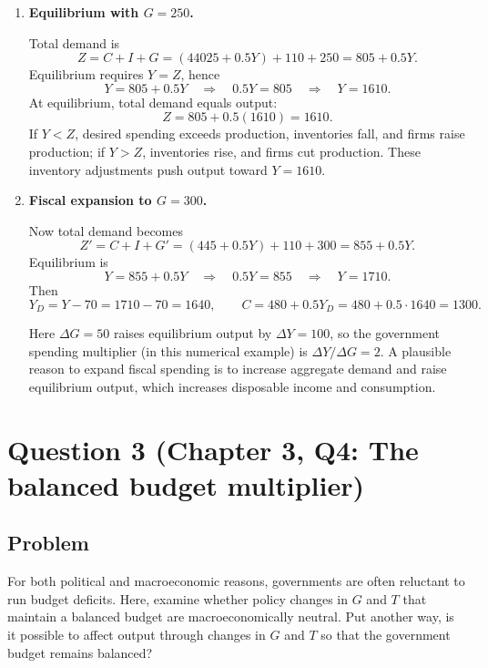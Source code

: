 \documentclass[12pt]{article}
\begin{document}
\begin{enumerate}[label=(\alph*)]
\item \textbf{Equilibrium with \(G=250\).}

Total demand is
\[
Z = C + I + G = (44025 + 0.5Y) + 110 + 250 = 805 + 0.5Y.
\]
Equilibrium requires \(Y=Z\), hence
\[
Y = 805 + 0.5Y
\quad\Rightarrow\quad
0.5Y = 805
\quad\Rightarrow\quad
Y = 1610.
\]
At equilibrium, total demand equals output:
\[
Z = 805 + 0.5(1610) = 1610.
\]
If \(Y<Z\), desired spending exceeds production, inventories fall, and firms raise production; if \(Y>Z\), inventories rise, and firms cut production. These inventory adjustments push output toward \(Y=1610\).

\item \textbf{Fiscal expansion to \(G=300\).}

Now total demand becomes
\[
Z' = C + I + G' = (445 + 0.5Y) + 110 + 300 = 855 + 0.5Y.
\]
Equilibrium is
\[
Y = 855 + 0.5Y
\quad\Rightarrow\quad
0.5Y = 855
\quad\Rightarrow\quad
Y = 1710.
\]
Then
\[
Y_D = Y - 70 = 1710 - 70 = 1640,
\qquad
C = 480 + 0.5Y_D = 480 + 0.5\cdot 1640 = 1300.
\]

Here \(\Delta G = 50\) raises equilibrium output by \(\Delta Y = 100\), so the government spending multiplier (in this numerical example) is \(\Delta Y/\Delta G = 2\). A plausible reason to expand fiscal spending is to increase aggregate demand and raise equilibrium output, which increases disposable income and consumption.
\end{enumerate}

\bigskip


\newpage

\section*{Question 3 (Chapter 3, Q4: The balanced budget multiplier)}

\subsection*{Problem}

For both political and macroeconomic reasons, governments are often reluctant to run budget deficits. Here, examine whether policy changes in \(G\) and \(T\) that maintain a balanced budget are macroeconomically neutral. Put another way, is it possible to affect output through changes in \(G\) and \(T\) so that the government budget remains balanced?
\end{document}
